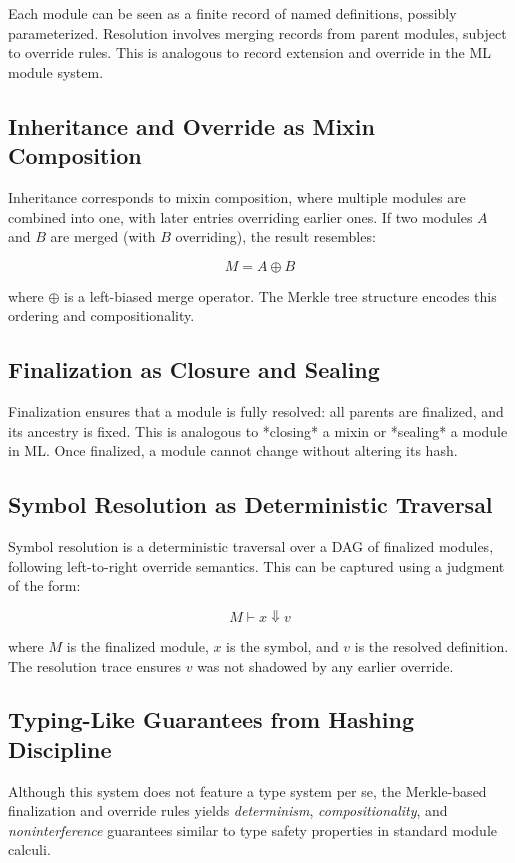 \documentclass[sigplan,screen]{acmart}
\begin{document}
Each module can be seen as a finite record of named definitions, possibly parameterized. Resolution involves merging records from parent modules, subject to override rules. This is analogous to record extension and override in the ML module system.

\subsection{Inheritance and Override as Mixin Composition}

Inheritance corresponds to mixin composition, where multiple modules are combined into one, with later entries overriding earlier ones. If two modules $A$ and $B$ are merged (with $B$ overriding), the result resembles:

\[
M = A \oplus B
\]

where $\oplus$ is a left-biased merge operator. The Merkle tree structure encodes this ordering and compositionality.

\subsection{Finalization as Closure and Sealing}

Finalization ensures that a module is fully resolved: all parents are finalized, and its ancestry is fixed. This is analogous to *closing* a mixin or *sealing* a module in ML. Once finalized, a module cannot change without altering its hash.

\subsection{Symbol Resolution as Deterministic Traversal}

Symbol resolution is a deterministic traversal over a DAG of finalized modules, following left-to-right override semantics. This can be captured using a judgment of the form:

\[
M \vdash x \Downarrow v
\]

where $M$ is the finalized module, $x$ is the symbol, and $v$ is the resolved definition. The resolution trace ensures $v$ was not shadowed by any earlier override.

\subsection{Typing-Like Guarantees from Hashing Discipline}

Although this system does not feature a type system per se, the Merkle-based finalization and override rules yields \emph{determinism}, \emph{compositionality}, and \emph{noninterference} guarantees similar to type safety properties in standard module calculi.
\end{document}
